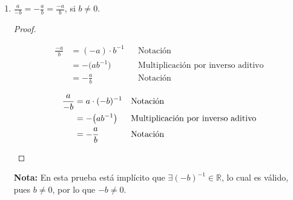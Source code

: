 \documentclass[11pt]{article}
\newcommand{\R}{\mathbb{R}}
\begin{document}
\begin{enumerate}[label=\alph*)]
    \item $\frac{a}{-b} = -\frac{a}{b}=\frac{-a}{b}$, si $b\neq 0$.
    \vspace{-1em}\begin{proof} \leavevmode
        \begin{center}\vspace{-2em}
            \begin{minipage}[t]{.5\linewidth}
                \begin{align*}
                    \frac{-a}{b} &= (-a)\cdot b^{-1} && \text{Notación}\\
                    &= -\bigl(ab^{-1}\bigr) && \text{Multiplicación por inverso aditivo}\\
                    &= -\frac{a}{b} && \text{Notación}
                \end{align*}
            \end{minipage}%
            \begin{minipage}[t]{.5\linewidth}
                \begin{align*}
                    \frac{a}{-b} &= a \cdot (-b)^{-1} && \text{Notación}\\
            &= -\bigl(ab^{-1}\bigr) && \text{Multiplicación por inverso aditivo}\\
            &= -\frac{a}{b} && \text{Notación} \qedhere
                \end{align*}
            \end{minipage}
            \end{center}    
    \end{proof} \vspace{-1em}
    \textbf{Nota:} En esta prueba está implícito que $\exists (-b)^{-1}\in \R$, lo cual es válido, pues $b\neq 0$, por lo que $-b\neq 0$.

\end{enumerate}
\end{document}
